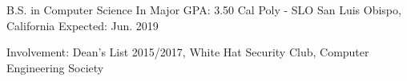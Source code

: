 


\begin{cventries}


\cventry
{B.S. in Computer Science In Major GPA: 3.50} %
{Cal Poly - SLO} %
{San Luis Obispo, California} %
{Expected: Jun. 2019} %
{ %
\begin{cvitems}
\item {Involvement: Dean's List 2015/2017, White Hat Security Club, Computer Engineering Society }
\end{cvitems}
}


\end{cventries}
